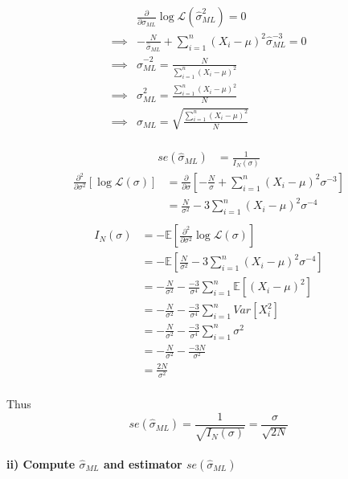 \documentclass{article}
\newcommand{\E}{\mathbb{E}}
\renewcommand{\L}{\mathcal{L}}
\begin{document}
\begin{align*}
             & \frac{\partial}{\partial \hat \sigma_{ML}} \log \L(\hat \sigma_{ML}^2) = 0                    \\
    \implies & - \frac{N}{\hat \sigma_{ML}} +\sum_{i=1}^n \left(X_i - \mu\right)^2 \hat \sigma_{ML}^{-3} = 0 \\
    \implies & \hat \sigma_{ML}^{-2} = \frac{N}{\sum_{i=1}^n \left(X_i - \mu\right)^2}                       \\
    \implies & \hat \sigma_{ML}^{2} = \frac{\sum_{i=1}^n \left(X_i - \mu\right)^2}{N}                        \\
    \implies & \hat \sigma_{ML} = \sqrt{\frac{\sum_{i=1}^n \left(X_i - \mu\right)^2}{N}}                     \\
\end{align*}

\begin{align*}
    se (\hat \sigma_{ML}) & = \frac{1}{I_N (\sigma)}
\end{align*}
\begin{align*}
    \frac{\partial^2}{\partial \sigma^2} \left[ \log \L (\sigma) \right]
     & = \frac{\partial}{\partial \sigma} \left[ - \frac{N}{\sigma} +\sum_{i=1}^n \left(X_i - \mu\right)^2 \sigma^{-3} \right] \\
     & =  \frac{N}{\sigma^2} -3 \sum_{i=1}^n \left(X_i - \mu\right)^2 \sigma^{-4}                                              \\
\end{align*}
\begin{align*}
    I_N(\sigma)
     & = - \E \left[ \frac{\partial^2}{\partial \sigma^2} \log \L (\sigma) \right]                            \\
     & = - \E \left[ \frac{N}{\sigma^2} -3 \sum_{i=1}^n \left(X_i - \mu\right)^2 \sigma^{-4} \right]          \\
     & = - \frac{N}{\sigma^2} - \frac{-3}{\sigma^{4}} \sum_{i=1}^n \E \left[ \left(X_i - \mu\right)^2 \right] \\
     & = - \frac{N}{\sigma^2} - \frac{-3}{\sigma^{4}} \sum_{i=1}^n Var \left[ X_i ^2 \right]                  \\
     & = - \frac{N}{\sigma^2} - \frac{-3}{\sigma^{4}} \sum_{i=1}^n \sigma^2                                   \\
     & = - \frac{N}{\sigma^2} - \frac{-3N}{\sigma^{2}}                                                        \\
     & = \frac{2N}{\sigma^{2}}                                                                                \\
\end{align*}

Thus 
\[
    se(\hat \sigma_{ML}) = \frac{1}{\sqrt{I_N (\sigma)}} = \frac{\sigma}{\sqrt{2N}}
\]

\paragraph{ii) Compute \(\hat{\sigma}_{ML}\) and estimator \(se(\hat{\sigma}_{ML})\)}
\end{document}

